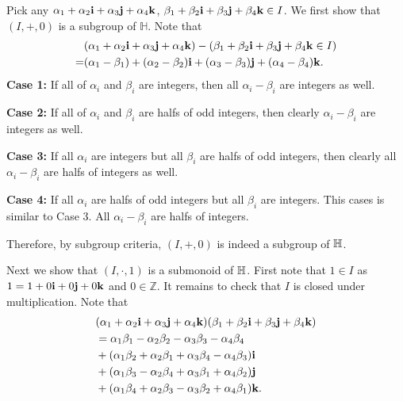 \documentclass[12pt]{article}
\begin{document}
\begin{fproof}[Jacobson 2.4.5]
    Pick any \(\alpha_1 + \alpha_2\mathbf{i} + \alpha_3 \mathbf{j} + \alpha_4\mathbf{k}\), \(\beta_1 + \beta_2\mathbf{i} + \beta_3 \mathbf{j} + \beta_4\mathbf{k} \in I\).
    We first show that \((I, +, 0)\) is a subgroup of \(\mathbb{H}\).
    Note that
    \begin{align*}
        &(\alpha_1 + \alpha_2\mathbf{i} + \alpha_3 \mathbf{j} + \alpha_4\mathbf{k}) - (\beta_1 + \beta_2\mathbf{i} + \beta_3 \mathbf{j} + \beta_4\mathbf{k} \in I)\\
        =&(\alpha_1 - \beta_1) + (\alpha_2 - \beta_2)\mathbf{i} + (\alpha_3 - \beta_3)\mathbf{j} + (\alpha_4 - \beta_4)\mathbf{k}.
    \end{align*}
    \textbf{Case 1:}
    If all of \(\alpha_i\) and \(\beta_i\) are integers, then all \(\alpha_i - \beta_i\) are integers as well.

    \textbf{Case 2:}
    If all of \(\alpha_i\) and \(\beta_i\) are halfs of odd integers, then clearly \(\alpha_i - \beta_i\) are integers as well.

    \textbf{Case 3:}
    If all \(\alpha_i\) are integers but all \(\beta_i\) are halfs of odd integers,
    then clearly all \(\alpha_i - \beta_i\) are halfs of integers as well.

    \textbf{Case 4:}
    If all \(\alpha_i\) are halfs of odd integers but all \(\beta_i\) are integers.
    This cases is similar to Case 3. All \(\alpha_i - \beta_i\) are halfs of integers.

    Therefore, by subgroup criteria, \((I, +, 0)\) is indeed a subgroup of \(\mathbb {H}\).

    Next we show that \((I, \cdot, 1)\) is a submonoid of \(\mathbb {H}\).
    First note that \(1 \in I\) as \(1 = 1 + 0\mathbf{i} + 0\mathbf{j} + 0\mathbf{k}\) and \(0 \in \mathbb{Z}\).
    It remains to check that \(I\) is closed under multiplication.
    Note that
    \begin{align*}
        &(\alpha_1 + \alpha_2\mathbf{i} + \alpha_3 \mathbf{j} + \alpha_4\mathbf{k})(\beta_1 + \beta_2\mathbf{i} + \beta_3 \mathbf{j} + \beta_4\mathbf{k})\\
        &=\alpha_1 \beta_1 - \alpha_2 \beta_2 - \alpha_3 \beta_3 - \alpha_4 \beta_4\\
        & +(\alpha_1 \beta_2 + \alpha_2 \beta_1 + \alpha_3 \beta_4 - \alpha_4 \beta_3)\mathbf{i}\\
        & +(\alpha_1 \beta_3 - \alpha_2 \beta_4 + \alpha_3 \beta_1 + \alpha_4 \beta_2)\mathbf{j}\\
        & +(\alpha_1 \beta_4 + \alpha_2 \beta_3 - \alpha_3 \beta_2 + \alpha_4 \beta_1)\mathbf{k}.
    \end{align*}


\end{fproof}
\end{document}
